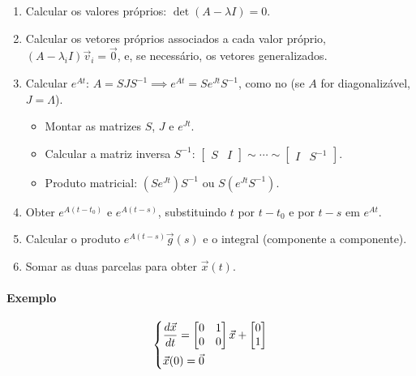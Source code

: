 \documentclass{article}
\begin{document}
\begin{enumerate}
    \item Calcular os valores próprios: $\det(A - \lambda I) = 0$.
    \item Calcular os vetores próprios associados a cada valor próprio, $(A - \lambda_i I)\vec{v}_i = \vec{0}$,
    e, se necessário, os vetores generalizados.
    \item Calcular $e^{At}$:
    $\boxed{A = S J S^{-1} \implies e^{At} = S e^{J t} S^{-1}}$,
    como no  (se $A$ for diagonalizável, $J = \Lambda$).
    \begin{itemize}
        \item Montar as matrizes $S$, $J$ e $e^{J t}$.
        \item Calcular a matriz inversa $S^{-1}$:
        $\left[ \begin{array}{c|c} S & I \end{array} \right] \sim \cdots \sim
        \left[ \begin{array}{c|c} I & S^{-1} \end{array} \right]$.
        \item Produto matricial: $(S e^{J t})S^{-1}$ ou $S (e^{J t} S^{-1})$.
    \end{itemize}
    \item Obter $e^{A(t - t_0)}$ e $e^{A(t - s)}$, substituindo $t$ por $t - t_0$ e por $t - s$ em $e^{At}$.
    \item Calcular o produto $e^{A(t - s)}\vec{g}(s)$ e o integral (componente a componente).
    \item Somar as duas parcelas para obter $\vec{x}(t)$.
\end{enumerate}

\paragraph{Exemplo}

\begin{gather*}
\begin{dcases}
\frac{d\vec{x}}{dt} =
\begin{bmatrix}
0 & 1 \\
0 & 0
\end{bmatrix}
\vec{x}
+
\begin{bmatrix}
0 \\
1
\end{bmatrix} \\
\vec{x}(0) = \vec{0}
\end{dcases}
\end{gather*}
\end{document}

